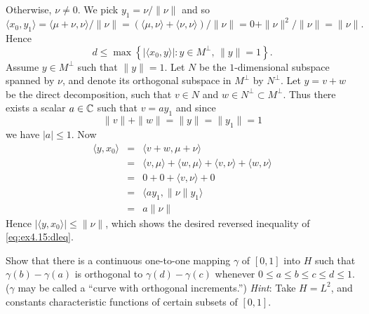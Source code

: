 \begin{enumerate}
Otherwise, \(\nu \neq 0\).
We pick \(y_1 = \nu/\|\nu\|\) and so
\begin{equation*}
\langle x_0, y_1\rangle
= \langle \mu + \nu, \nu\rangle / \| \nu \|
= (\langle \mu , \nu\rangle +  \langle \nu, \nu\rangle) / \| \nu \|
= 0 + \|\nu\|^2 / \|\nu\|
= \|\nu\|.
\end{equation*}
Hence
\begin{equation} \label{eq:ex4.15:dleq}
d \leq  \max \left\{|\langle x_0,y\rangle|: y\in M^\perp,\, \|y\|=1\right\}.
\end{equation}
Assume \(y\in M^\perp\) such that \(\|y\|=1\).
Let $N$ be the $1$-dimensional subspace spanned by \(\nu\),
and denote its orthogonal subspace in \(M^\perp\) by \(N^\perp\).
Let \(y = v + w\) be the direct decomposition,
such that \(v\in N\) and \(w\in N^\perp \subset M^\perp\).
Thus there exists a scalar \(a\in\mathbb{C}\) such that \(v = ay_1\)
and since
\begin{equation*}
\|v\| + \|w\| = \|y\| = \|y_1\| = 1
\end{equation*}
we have \(|a| \leq 1\).
Now
\begin{eqnarray*}
\langle y, x_0 \rangle
&=& \langle v+w, \mu + \nu \rangle \\
&=&   \langle v, \mu \rangle
    + \langle w, \mu \rangle
    + \langle v, \nu \rangle
    + \langle w, \nu \rangle \\
&=& 0 + 0 + \langle v, \nu \rangle + 0 \\
&=& \langle a y_1, \|\nu\| y_1 \rangle \\
&=& a\|\nu\|
\end{eqnarray*}
Hence \(|\langle y, x_0 \rangle| \leq \|\nu\|\), which shows
the desired reversed inequality of \eqref{eq:ex4.15:dleq}.

\iffalse
Since
\begin{equation*}
  \langle x_0, \nu \rangle
= \langle x_0, \nu \rangle
= \langle x_0, x_0 - \mu \rangle
= \|x_0\|^2 - \langle x_0, \mu \rangle
\end{equation*}
\fi

\begin{excopy}
Show that there is a continuous one-to-one mapping \(\gamma\) of \([0,1]\)
into $H$ such that
\(\gamma(b) - \gamma(a)\) is orthogonal to
\(\gamma(d) - \gamma(c)\) whenever
\(0\leq a \leq b \leq c \leq d \leq 1\).
(\(\gamma\) may be called a ``curve with orthogonal increments.'')
\emph{Hint}: Take \(H=L^2\), and constants characteristic functions
 of certain subsets of \([0,1]\).
\end{excopy}


\end{enumerate}
